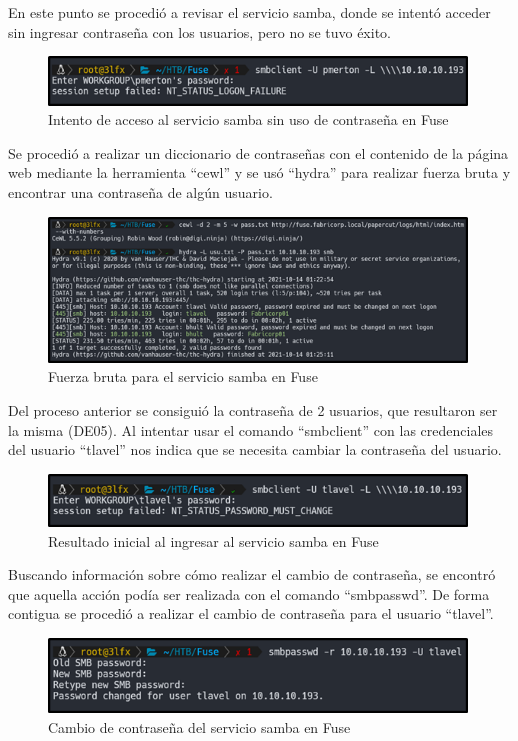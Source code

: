 En este punto se procedió a revisar el servicio samba, donde se intentó acceder sin ingresar contraseña con los usuarios, pero no se tuvo éxito.
\begin{figure}[H]
    \centering
    \includegraphics[width=0.99\textwidth]{imagenes/intsmbfuse.png}
    \caption{Intento de acceso al servicio samba sin uso de contraseña en Fuse}
\end{figure}
Se procedió a realizar un diccionario de contraseñas con el contenido de la página web mediante la herramienta “cewl” y se usó “hydra” para realizar fuerza bruta y encontrar una contraseña de algún usuario.
\begin{figure}[H]
    \centering
    \includegraphics[width=0.99\textwidth]{imagenes/brusmbfuse.png}
    \caption{Fuerza bruta para el servicio samba en Fuse}
\end{figure}
Del proceso anterior se consiguió la contraseña de 2 usuarios, que resultaron ser la misma (DE05). Al intentar usar el comando “smbclient” con las credenciales del usuario “tlavel” nos indica que se necesita cambiar la contraseña del usuario.
\begin{figure}[H]
    \centering
    \includegraphics[width=0.99\textwidth]{imagenes/resinismbfuse.png}
    \caption{Resultado inicial al ingresar al servicio samba en Fuse}
\end{figure}
Buscando información sobre cómo realizar el cambio de contraseña, se encontró que aquella acción podía ser realizada con el comando “smbpasswd”. De forma contigua se procedió a realizar el cambio de contraseña para el usuario “tlavel”.
\begin{figure}[H]
    \centering
    \includegraphics[width=0.99\textwidth]{imagenes/camsmbfuse.png}
    \caption{Cambio de contraseña del servicio samba en Fuse}
\end{figure}
